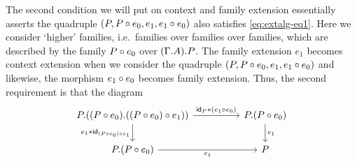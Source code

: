 The second condition we will put on context and family extension essentially 
asserts the quadruple $(P,\jcomp{}{e_0}{P},e_1,\jcomp{}{e_0}{e_1})$ also satisfies 
\autoref{eq:extalg-eq1}. Here we consider `higher' families, i.e.~families over
families over families, which are described by the family 
$\jcomp{}{e_0}{P}$ over $\ctxext{{\Gamma}{A}}{P}$. The family
extension $e_1$ becomes context extension when we consider the quadruple
$(P,\jcomp{}{e_0}{P},e_1,\jcomp{}{e_0}{e_1})$ and likewise, the morphism
$\jcomp{}{e_0}{e_1}$ becomes family extension. Thus, the second requirement is 
that the diagram
\begin{equation}\label{eq:extalg-eq2}
\begin{tikzcd}[column sep=huge]
\ctxext{P}{{\jcomp{}{e_0}{P}}{\jcomp{}{e_1}{\jcomp{}{e_0}{P}}}} 
  \ar{d}[swap]{\jvcomp{}{e_1}{\idtm{\jcomp{}{e_1}{\jcomp{}{e_0}{P}}}}
    } 
  \ar{r}{\jvcomp{}{\idtm{P}}{\jcomp{}{e_0}{e_1}}
    } 
  & \ctxext{P}{\jcomp{}{e_0}{P}} \ar{d}{e_1}\\
\ctxext{P}{\jcomp{}{e_0}{P}} \ar{r}[swap]{e_1} & P
\end{tikzcd}
\end{equation}

